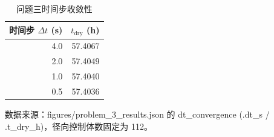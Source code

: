 \begin{table}[H]
  \centering
  \caption{问题三时间步收敛性}
  \label{tab:dt}
  \begin{tabular}{rr}
    \toprule
    时间步 $\Delta t$ (s) & $t_{\mathrm{dry}}$ (h) \\
    \midrule
    4.0 & 57.4067 \\
    2.0 & 57.4049 \\
    1.0 & 57.4040 \\
    0.5 & 57.4036 \\
    \bottomrule
  \end{tabular}
  \par\vspace{2pt}\footnotesize 数据来源：figures/problem\_3\_results.json 的 dt\_convergence (.dt\_s / .t\_dry\_h)，径向控制体数固定为 112。
\end{table}
